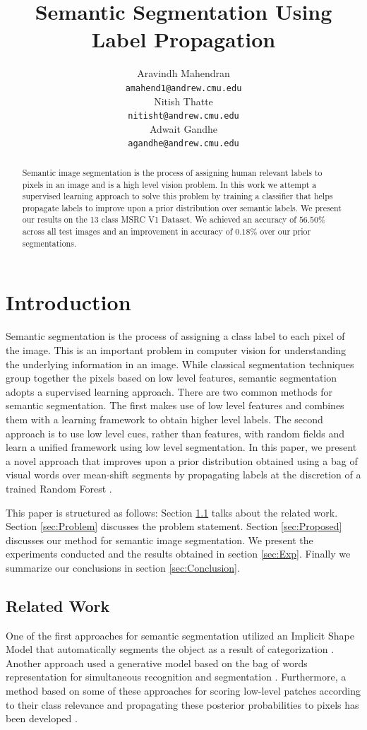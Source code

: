 \documentclass{article} %
\title{Semantic Segmentation Using Label Propagation}
\author{
Aravindh Mahendran \\
\texttt{amahend1@andrew.cmu.edu} \\ 
\And
Nitish Thatte \\
\texttt{nitisht@andrew.cmu.edu} \\
\AND
Adwait Gandhe \\
\texttt{agandhe@andrew.cmu.edu} \\
}
\begin{document}
\maketitle

\begin{abstract}
Semantic image segmentation is the process of assigning human relevant labels to pixels in an image and is a high level vision problem. In this work we attempt a supervised learning approach to solve this problem by training a classifier that helps propagate labels to improve upon a prior distribution over semantic labels. We present our results on the 13 class MSRC V1 Dataset. We achieved an accuracy of $56.50\%$ across all test images and an improvement in accuracy of $0.18\%$ over our prior segmentations.
\end{abstract}

\section{Introduction}
Semantic segmentation is the process of assigning a class label to each pixel of the image. This is an important problem in computer vision for understanding the underlying information in an image. While classical segmentation techniques group together the pixels based on low level features, semantic segmentation adopts a supervised learning approach. There are two common methods for semantic segmentation. The first makes use of low level features and combines them with a learning framework to obtain higher level labels. The second approach is to use low level cues, rather than features, with random fields and learn a unified framework using low level segmentation. In this paper, we present a novel approach that improves upon a prior distribution obtained using a bag of visual words over mean-shift segments by propagating labels at the discretion of a trained Random Forest \cite{Statistics01randomforests}.

This paper is structured as follows: Section \ref{sec:Related} talks about the related work. Section \ref{sec:Problem} discusses the problem statement. Section \ref{sec:Proposed} discusses our method for semantic image segmentation. We present the experiments conducted and the results obtained in section \ref{sec:Exp}. Finally we summarize our conclusions in section \ref{sec:Conclusion}.
\label{sec:Intro}

\subsection{Related Work}
\label{sec:Related}
One of the first approaches for semantic segmentation utilized an Implicit Shape Model \cite{Leibe04combinedobject} that automatically segments the object as a result of categorization .
Another approach used a generative model based on the bag of words representation for simultaneous recognition and segmentation \cite{cao:spatially}.  
Furthermore, a method based on some of these approaches for scoring low-level patches according to their class relevance and propagating these posterior probabilities to pixels has been developed \cite{conf/bmvc/CsurkaP08}.
\end{document}
